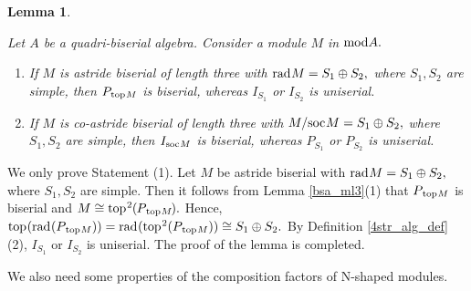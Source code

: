 \documentclass[10pt]{amsart}
\newtheorem{Lemma}[Theo]{Lemma}
\theoremstyle{definition}
\newcommand{\mmod}{{\rm mod}}
\newcommand{\rad}{{\rm rad}\hspace{.5pt}}
\newcommand{\soc}{{\rm soc}\hspace{.5pt}}
\newcommand{\ntop}{{\rm top}\hspace{.5pt}}
\begin{document}
\begin{Lemma} \label{4bs_loc_l3}

Let $A$ be a quadri-biserial algebra. Consider a module $M$ in $\mmod A.$

\begin{enumerate}[$(1)$]

\vspace{-2pt}

\item  If $M$ is astride biserial of length three with $\rad M=S_1\oplus S_2,$ \vspace{-1pt} where $S_1, S_2$ are simple, then $P_{\hspace{.5pt} \ntop M}$ is biserial, whereas $I_{S_1}$ or $I_{S_2}$ is uniserial.

\vspace{.5pt}

\item If $M$ is co-astride biserial of length three with $M/\soc M=S_1\oplus S_2,$ \vspace{-1pt} where $S_1, S_2$ are simple, then $I_{\soc M}$ is biserial, whereas $P_{S_1}$ or $P_{S_2}$ is uniserial.
    
\end{enumerate}\end{Lemma}

 We only prove Statement (1). Let $M$ be astride biserial with $\rad M=S_1\oplus S_2,$ where $S_1, S_2$ are simple. Then it follows from Lemma \ref{bsa_ml3}(1) that $P_{\hspace{1pt}\ntop M}$ is biserial and $M\cong \ntop^2 \hspace{-.2pt}( \hspace{-.5pt}P_{\hspace{1pt}\ntop M}\hspace{-1pt}).$ Hence, $\ntop(\rad(P_{\hspace{1pt}\ntop M})) =\rad(\ntop^2(P_{\hspace{1pt}\ntop M}))\cong S_1\oplus S_2.$ By Definition \ref{4str_alg_def}(2), $I_{S_1}$ or $I_{S_2}$ is uniserial. The proof of the lemma is completed.

\smallskip

We also need some properties of the composition factors of N-shaped modules.
\end{document}
